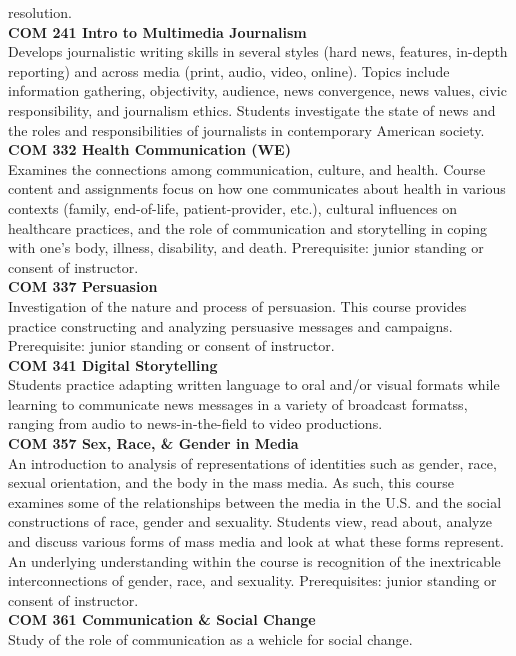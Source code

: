 \documentclass[
  letterpaper,
]{scrbook}
\begin{document}
resolution.\\
\textbf{COM 241 Intro to Multimedia Journalism}\\
Develops journalistic writing skills in several styles (hard news,
features, in-depth reporting) and across media (print, audio, video,
online). Topics include information gathering, objectivity, audience,
news convergence, news values, civic responsibility, and journalism
ethics. Students investigate the state of news and the roles and
responsibilities of journalists in contemporary American society.\\
\textbf{COM 332 Health Communication (WE)}\\
Examines the connections among communication, culture, and health.
Course content and assignments focus on how one communicates about
health in various contexts (family, end-of-life, patient-provider,
etc.), cultural influences on healthcare practices, and the role of
communication and storytelling in coping with one's body, illness,
disability, and death. Prerequisite: junior standing or consent of
instructor.\\
\textbf{COM 337 Persuasion}\\
Investigation of the nature and process of persuasion. This course
provides practice constructing and analyzing persuasive messages and
campaigns. Prerequisite: junior standing or consent of instructor.\\
\textbf{COM 341 Digital Storytelling}\\
Students practice adapting written language to oral and/or visual
formats while learning to communicate news messages in a variety of
broadcast formatss, ranging from audio to news-in-the-field to video
productions.\\
\textbf{COM 357 Sex, Race, \& Gender in Media}\\
An introduction to analysis of representations of identities such as
gender, race, sexual orientation, and the body in the mass media. As
such, this course examines some of the relationships between the media
in the U.S. and the social constructions of race, gender and sexuality.
Students view, read about, analyze and discuss various forms of mass
media and look at what these forms represent. An underlying
understanding within the course is recognition of the inextricable
interconnections of gender, race, and sexuality. Prerequisites: junior
standing or consent of instructor.\\
\textbf{COM 361 Communication \& Social Change}\\
Study of the role of communication as a wehicle for social change.
\end{document}
